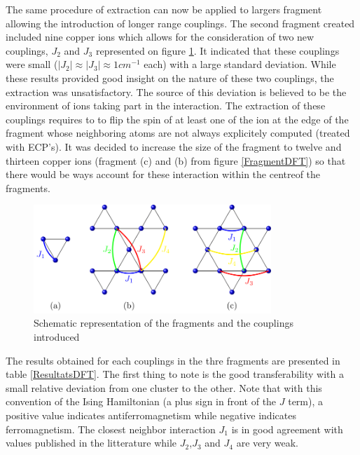\documentclass[10pt]{report}
\numberwithin{equation}{section}
\begin{document}
The same procedure of extraction can now be applied to largers fragment allowing the introduction of longer range couplings.
The second fragment created included nine copper ions which allows for the consideration of two new couplings, $J_2$ and $J_3$ represented on figure \ref{CouplageDFT}.
It indicated that these couplings were small ($|J_{2}|\approx |J_{3}|\approx1 cm^{-1}$ each) with a large standard deviation.
While these results provided good insight on the nature of these two couplings, the extraction was unsatisfactory.
The source of this deviation is believed to be the environment of ions taking part in the interaction. 
The extraction of these couplings requires to to flip the spin of at least one of the ion at the edge of the fragment whose neighboring atoms are not always explicitely computed (treated with ECP's).
It was decided to increase the size of the fragment to twelve and thirteen copper ions (fragment (c) and (b) from figure \ref{FragmentDFT}) so that there would be ways account for these interaction within the centreof the fragments.


\begin{figure}[h!]
    \centering
    \includegraphics[width=0.8\textwidth]{Images/ModeleDFT_plan.png}
    \caption{Schematic representation of the fragments and the couplings introduced}
    \label{CouplageDFT}
\end{figure}

The results obtained for each couplings in the thre fragments are presented in table \ref{ResultatsDFT}.
The first thing to note is the good transferability with a small relative deviation from one cluster to the other.
Note that with this convention of the Ising Hamiltonian (a plus sign in front of the $J$ term), a positive value indicates antiferromagnetism while negative indicates ferromagnetism.
The closest neighbor interaction $J_1$ is in good agreement with values published in the litterature while $J_2$,$J_3$ and $J_4$ are very weak. 
\end{document}
